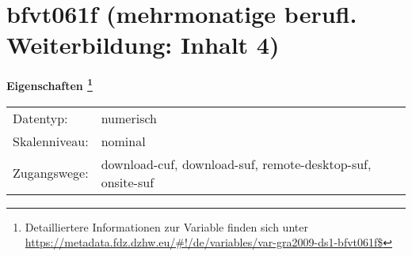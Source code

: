 
    \setcounter{footnote}{0}

    \vspace*{-1.8cm}
	\section{bfvt061f (mehrmonatige berufl. Weiterbildung: Inhalt 4)}
	\label{section:bfvt061f}



    \vspace*{0.5cm}
    \noindent\textbf{Eigenschaften
	\footnote{Detailliertere Informationen zur Variable finden sich unter
		\url{https://metadata.fdz.dzhw.eu/\#!/de/variables/var-gra2009-ds1-bfvt061f$}}}\\
	\begin{tabularx}{\hsize}{@{}lX}
	Datentyp: & numerisch \\
	Skalenniveau: & nominal \\
	Zugangswege: &
	  download-cuf, 
	  download-suf, 
	  remote-desktop-suf, 
	  onsite-suf
 \\
    \end{tabularx}



